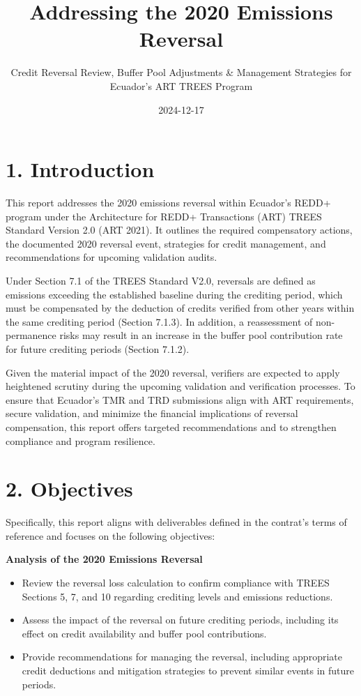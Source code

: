 \documentclass[
  letterpaper,
  DIV=11,
  numbers=noendperiod]{scrartcl}
\title{Addressing the 2020 Emissions Reversal}
\subtitle{Credit Reversal Review, Buffer Pool Adjustments \& Management
Strategies for Ecuador's ART TREES Program}
\author{}
\date{2024-12-17}
\providecommand{\tightlist}{%
  \setlength{\itemsep}{0pt}\setlength{\parskip}{0pt}}\usepackage{longtable,booktabs,array}
\renewcommand*\contentsname{Table of contents}
\newcommand\contentsname{Table of contents}
\begin{document}
\maketitle

\renewcommand*\contentsname{Table of contents}
{
\hypersetup{linkcolor=}
\setcounter{tocdepth}{3}
\tableofcontents
}

\hypertarget{introduction}{%
\section{1. Introduction}\label{introduction}}

This report addresses the 2020 emissions reversal within Ecuador's REDD+
program under the Architecture for REDD+ Transactions (ART) TREES
Standard Version 2.0 (ART 2021). It outlines the required compensatory
actions, the documented 2020 reversal event, strategies for credit
management, and recommendations for upcoming validation audits.

Under Section 7.1 of the TREES Standard V2.0, reversals are defined as
emissions exceeding the established baseline during the crediting
period, which must be compensated by the deduction of credits verified
from other years within the same crediting period (Section 7.1.3). In
addition, a reassessment of non-permanence risks may result in an
increase in the buffer pool contribution rate for future crediting
periods\hspace{0pt} (Section 7.1.2).

Given the material impact of the 2020 reversal, verifiers are expected
to apply heightened scrutiny during the upcoming validation and
verification processes. To ensure that Ecuador's TMR and TRD submissions
align with ART requirements, secure validation, and minimize the
financial implications of reversal compensation, this report offers
targeted recommendations and to strengthen compliance and program
resilience.

\hypertarget{objectives}{%
\section{2. Objectives}\label{objectives}}

Specifically, this report aligns with deliverables defined in the
contrat's terms of reference and focuses on the following objectives:

\textbf{Analysis of the 2020 Emissions Reversal}

\begin{itemize}
\tightlist
\item
  Review the reversal loss calculation to confirm compliance with TREES
  Sections 5, 7, and 10 regarding crediting levels and emissions
  reductions.
\item
  Assess the impact of the reversal on future crediting periods,
  including its effect on credit availability and buffer pool
  contributions.
\item
  Provide recommendations for managing the reversal, including
  appropriate credit deductions and mitigation strategies to prevent
  similar events in future periods.
\end{itemize}
\end{document}
